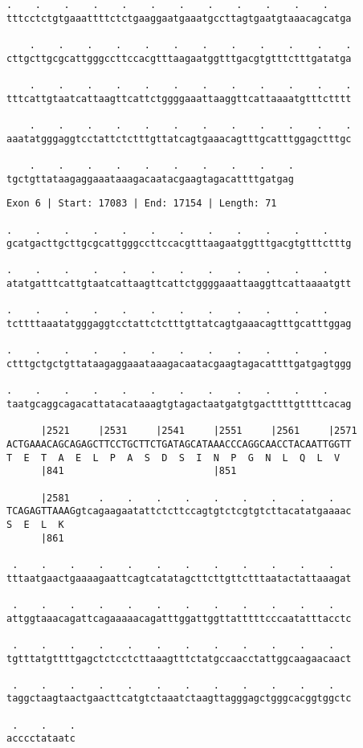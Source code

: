 \documentclass{article}
\begin{document}
\newpage
\begin{Verbatim}[fontfamily=courier]
    .    .    .    .    .    .    .    .    .    .    .    .
tttcctctgtgaaattttctctgaaggaatgaaatgccttagtgaatgtaaacagcatga

    .    .    .    .    .    .    .    .    .    .    .    .
cttgcttgcgcattgggccttccacgtttaagaatggtttgacgtgtttctttgatatga

    .    .    .    .    .    .    .    .    .    .    .    .
tttcattgtaatcattaagttcattctggggaaattaaggttcattaaaatgtttctttt

    .    .    .    .    .    .    .    .    .    .    .    .
aaatatgggaggtcctattctctttgttatcagtgaaacagtttgcatttggagctttgc

    .    .    .    .    .    .    .    .    .    .
tgctgttataagaggaaataaagacaatacgaagtagacattttgatgag
\end{Verbatim}
\newpage
\begin{Verbatim}[fontfamily=courier]
Exon 6 | Start: 17083 | End: 17154 | Length: 71

.    .    .    .    .    .    .    .    .    .    .    .    
gcatgacttgcttgcgcattgggccttccacgtttaagaatggtttgacgtgtttctttg

.    .    .    .    .    .    .    .    .    .    .    .    
atatgatttcattgtaatcattaagttcattctggggaaattaaggttcattaaaatgtt

.    .    .    .    .    .    .    .    .    .    .    .    
tcttttaaatatgggaggtcctattctctttgttatcagtgaaacagtttgcatttggag

.    .    .    .    .    .    .    .    .    .    .    .    
ctttgctgctgttataagaggaaataaagacaatacgaagtagacattttgatgagtggg

.    .    .    .    .    .    .    .    .    .    .    .    
taatgcaggcagacattatacataaagtgtagactaatgatgtgacttttgttttcacag

      |2521     |2531     |2541     |2551     |2561     |2571
ACTGAAACAGCAGAGCTTCCTGCTTCTGATAGCATAAACCCAGGCAACCTACAATTGGTT
T  E  T  A  E  L  P  A  S  D  S  I  N  P  G  N  L  Q  L  V  
      |841                          |851                    

      |2581     .    .    .    .    .    .    .    .    .   
TCAGAGTTAAAGgtcagaagaatattctcttccagtgtctcgtgtcttacatatgaaaac
S  E  L  K                                                  
      |861                                                  

 .    .    .    .    .    .    .    .    .    .    .    .   
tttaatgaactgaaaagaattcagtcatatagcttcttgttctttaatactattaaagat

 .    .    .    .    .    .    .    .    .    .    .    .   
attggtaaacagattcagaaaaacagatttggattggttatttttcccaatatttacctc

 .    .    .    .    .    .    .    .    .    .    .    .   
tgtttatgttttgagctctcctcttaaagtttctatgccaacctattggcaagaacaact

 .    .    .    .    .    .    .    .    .    .    .    .   
taggctaagtaactgaacttcatgtctaaatctaagttagggagctgggcacggtggctc

 .    .    .
acccctataatc
\end{Verbatim}
\end{document}
